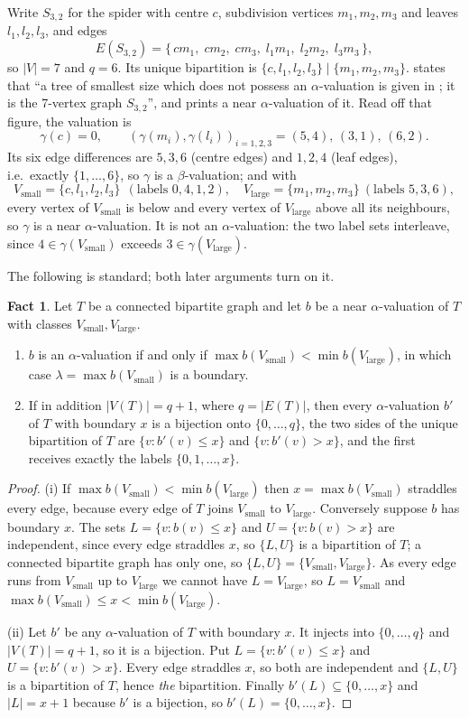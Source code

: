 \documentclass[11pt]{amsart}
\theoremstyle{definition}
\newtheorem{fact}[theorem]{Fact}
\theoremstyle{remark}
\newcommand{\Vsm}{V_{\mathrm{small}}}
\newcommand{\Vlg}{V_{\mathrm{large}}}
\begin{document}
Write $S_{3,2}$ for the spider with centre $c$, subdivision vertices
$m_1,m_2,m_3$ and leaves $l_1,l_2,l_3$, and edges
\[
 E(S_{3,2})=\{\,cm_1,\;cm_2,\;cm_3,\;l_1m_1,\;l_2m_2,\;l_3m_3\,\},
\]
so $|V|=7$ and $q=6$. Its unique bipartition is
$\{c,l_1,l_2,l_3\}\mid\{m_1,m_2,m_3\}$. \cite{AHM} states that ``a tree of
smallest size which does not possess an $\alpha$-valuation is given in
\cite{Rosa}; it is the 7-vertex graph $S_{3,2}$'', and prints a near
$\alpha$-valuation of it. Read off that figure, the valuation is
\begin{equation}\label{eq:gamma}
 \gamma(c)=0,\qquad
 (\gamma(m_i),\gamma(l_i))_{i=1,2,3}=(5,4),\,(3,1),\,(6,2).
\end{equation}
Its six edge differences are $5,3,6$ (centre edges) and $1,2,4$ (leaf edges),
i.e.\ exactly $\{1,\dots,6\}$, so $\gamma$ is a $\beta$-valuation; and with
\[
 \Vsm=\{c,l_1,l_2,l_3\}\ \ (\text{labels }0,4,1,2),
 \quad
 \Vlg=\{m_1,m_2,m_3\}\ (\text{labels }5,3,6),
\]
every vertex of $\Vsm$ is below and every vertex of $\Vlg$ above all its
neighbours, so $\gamma$ is a near $\alpha$-valuation. It is not an
$\alpha$-valuation: the two label sets interleave, since $4\in\gamma(\Vsm)$
exceeds $3\in\gamma(\Vlg)$.

The following is standard; both later arguments turn on it.

\begin{fact}\label{fact:0}
Let $T$ be a connected bipartite graph and let $b$ be a near
$\alpha$-valuation of $T$ with classes $\Vsm,\Vlg$.
\begin{enumerate}
\item[(i)] $b$ is an $\alpha$-valuation if and only if
$\max b(\Vsm)<\min b(\Vlg)$, in which case $\lambda=\max b(\Vsm)$ is a
boundary.
\item[(ii)] If in addition $|V(T)|=q+1$, where $q=|E(T)|$, then every
$\alpha$-valuation $b'$ of $T$ with boundary $x$ is a bijection onto
$\{0,\dots,q\}$, the two sides of the unique bipartition of $T$ are
$\{v:b'(v)\le x\}$ and $\{v:b'(v)>x\}$, and the first receives exactly the
labels $\{0,1,\dots,x\}$.
\end{enumerate}
\end{fact}

\begin{proof}
(i) If $\max b(\Vsm)<\min b(\Vlg)$ then $x=\max b(\Vsm)$ straddles every edge,
because every edge of $T$ joins $\Vsm$ to $\Vlg$. Conversely suppose $b$ has
boundary $x$. The sets $L=\{v:b(v)\le x\}$ and $U=\{v:b(v)>x\}$ are
independent, since every edge straddles $x$, so $\{L,U\}$ is a bipartition of
$T$; a connected bipartite graph has only one, so $\{L,U\}=\{\Vsm,\Vlg\}$. As
every edge runs from $\Vsm$ up to $\Vlg$ we cannot have $L=\Vlg$, so
$L=\Vsm$ and $\max b(\Vsm)\le x<\min b(\Vlg)$.

(ii) Let $b'$ be any $\alpha$-valuation of $T$ with boundary $x$. It injects
into $\{0,\dots,q\}$ and $|V(T)|=q+1$, so it is a bijection. Put
$L=\{v:b'(v)\le x\}$ and $U=\{v:b'(v)>x\}$. Every edge straddles $x$, so both
are independent and $\{L,U\}$ is a bipartition of $T$, hence \emph{the}
bipartition. Finally $b'(L)\subseteq\{0,\dots,x\}$ and $|L|=x+1$ because $b'$
is a bijection, so $b'(L)=\{0,\dots,x\}$.
\end{proof}
\end{document}
